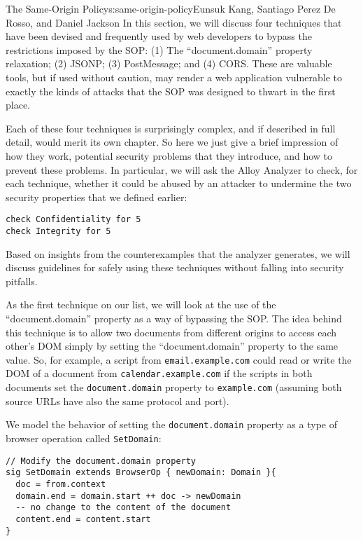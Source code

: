 \begin{aosachapter}{The Same-Origin Policy}{s:same-origin-policy}{Eunsuk Kang, Santiago Perez De Rosso, and Daniel Jackson}
In this section, we will discuss four techniques that have been devised
and frequently used by web developers to bypass the restrictions imposed
by the SOP: (1) The ``document.domain'' property relaxation; (2) JSONP;
(3) PostMessage; and (4) CORS. These are valuable tools, but if used
without caution, may render a web application vulnerable to exactly the
kinds of attacks that the SOP was designed to thwart in the first place.

Each of these four techniques is surprisingly complex, and if described
in full detail, would merit its own chapter. So here we just give a
brief impression of how they work, potential security problems that they
introduce, and how to prevent these problems. In particular, we will ask
the Alloy Analyzer to check, for each technique, whether it could be
abused by an attacker to undermine the two security properties that we
defined earlier:

\begin{verbatim}
check Confidentiality for 5
check Integrity for 5
\end{verbatim}

Based on insights from the counterexamples that the analyzer generates,
we will discuss guidelines for safely using these techniques without
falling into security pitfalls.

\label{domain-property}

As the first technique on our list, we will look at the use of the
``document.domain'' property as a way of bypassing the SOP. The idea
behind this technique is to allow two documents from different origins
to access each other's DOM simply by setting the ``document.domain''
property to the same value. So, for example, a script from
\texttt{email.example.com} could read or write the DOM of a document
from \texttt{calendar.example.com} if the scripts in both documents set
the \texttt{document.domain} property to \texttt{example.com} (assuming
both source URLs have also the same protocol and port).

We model the behavior of setting the \texttt{document.domain} property
as a type of browser operation called \texttt{SetDomain}:

\begin{verbatim}
// Modify the document.domain property
sig SetDomain extends BrowserOp { newDomain: Domain }{
  doc = from.context
  domain.end = domain.start ++ doc -> newDomain
  -- no change to the content of the document
  content.end = content.start
}
\end{verbatim}


\end{aosachapter}
